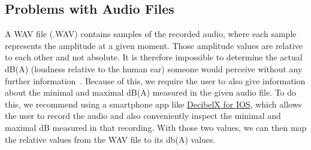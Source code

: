 \subsection{Problems with Audio Files}\label{subsec:problems-with-audio-files}
A WAV file (.WAV) contains samples of the recorded audio, where each sample represents the amplitude at a given moment.
Those amplitude values are relative to each other and not absolute.
It is therefore impossible to determine the actual dB(A) (loudness relative to the human ear) someone would perceive without any further information~\cite{adobe_community_how_to_know_the_real_world_db_level_of_a_file,stackoverflow_how_can_i_calculate_audio_db_level,stackexchange_exteracting_sound_pressure_from_wav_file}.
Because of this, we require the user to also give information about the minimal and maximal dB(A) measured in the given audio file.
To do this, we recommend using a smartphone app like \href{https://apps.apple.com/ch/app/dezibel-x-dba-l\%C3\%A4rm-messger\%C3\%A4t/id448155923}{DecibelX for IOS},
which allows the user to record the audio and also conveniently inspect the minimal and maximal dB measured in that recording.
With those two values, we can then map the relative values from the WAV file to its db(A) values.